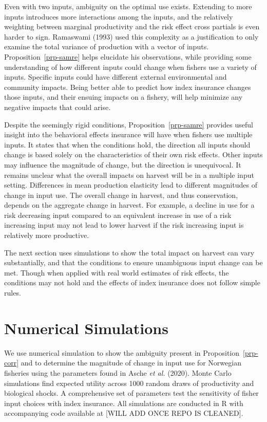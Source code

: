\documentclass[
  letterpaper,
  DIV=11,
  numbers=noendperiod]{scrartcl}
\theoremstyle{plain}
\theoremstyle{plain}
\theoremstyle{remark}
\begin{document}
Even with two inputs, ambiguity on the optimal use exists. Extending to
more inputs introduces more interactions among the inputs, and the
relatively weighting between marginal productivity and the risk effect
cross partials is even harder to sign. Ramaswami (1993) used this
complexity as a justification to only examine the total variance of
production with a vector of inputs. Proposition~\ref{prp-samre} helps
elucidate his observations, while providing some understanding of how
different inputs could change when fishers use a variety of inputs.
Specific inputs could have different external environmental and
community impacts. Being better able to predict how index insurance
changes those inputs, and their ensuing impacts on a fishery, will help
minimize any negative impacts that could arise.

Despite the seemingly rigid conditions, Proposition~\ref{prp-samre}
provides useful insight into the behavioral effects insurance will have
when fishers use multiple inputs. It states that when the conditions
hold, the direction all inputs should change is based solely on the
characteristics of their own risk effects. Other inputs may influence
the magnitude of change, but the direction is unequivocal. It remains
unclear what the overall impacts on harvest will be in a multiple input
setting. Differences in mean production elasticity lead to different
magnitudes of change in input use. The overall change in harvest, and
thus conservation, depends on the aggregate change in harvest. For
example, a decline in use for a risk decreasing input compared to an
equivalent increase in use of a risk increasing input may not lead to
lower harvest if the risk increasing input is relatively more
productive.

The next section uses simulations to show the total impact on harvest
can vary substantially, and that the conditions to ensure unambiguous
input change can be met. Though when applied with real world estimates
of risk effects, the conditions may not hold and the effects of index
insurance does not follow simple rules.

\hypertarget{sec-sim}{%
\section{Numerical Simulations}\label{sec-sim}}

We use numerical simulation to show the ambiguity present in
Proposition~\ref{prp-corr} and to determine the magnitude of change in
input use for Norwegian fisheries using the parameters found in Asche
\emph{et al.} (2020). Monte Carlo simulations find expected utility
across 1000 random draws of productivity and biological shocks. A
comprehensive set of parameters test the sensitivity of fisher input
choices with index insurance. All simulations are conducted in R with
accompanying code available at {[}WILL ADD ONCE REPO IS CLEANED{]}.
\end{document}
